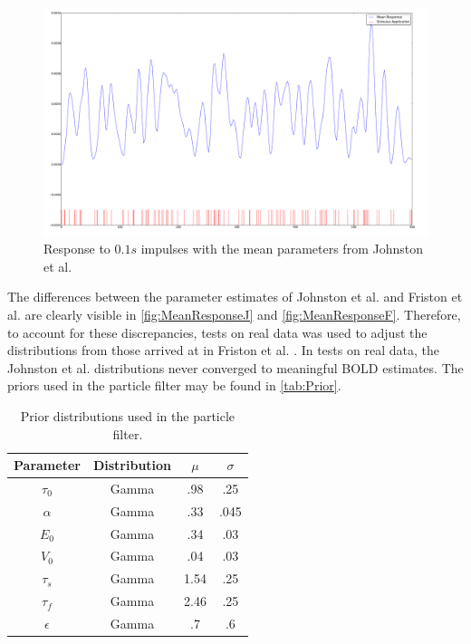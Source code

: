 \begin{figure}
\centering
\includegraphics[trim=6cm 2cm 6cm 2cm,width=15cm]{images/mean_response_johnston}
\caption{Response to $0.1s$ impulses with the mean parameters from 
Johnston et al. \cite{Johnston2007}}
\label{fig:MeanResponseJ}
\end{figure}

The differences between the parameter estimates of Johnston et al.
\cite{Johnston2007} and
Friston et al. \cite{Friston2002b} are clearly visible in 
\autoref{fig:MeanResponseJ} and \autoref{fig:MeanResponseF}.
Therefore, to account for these discrepancies, tests on
real data was used to adjust the distributions from those arrived at in
Friston et al. \cite{Friston2002b}. In tests on real data, the Johnston et al.
\cite{Johnston2007}
distributions never converged to meaningful \ac{BOLD} estimates.
The priors used in the particle filter may be found in \autoref{tab:Prior}.

\begin{table}[t]
\centering
\begin{tabular}{|c || c | c | c |}
\hline
Parameter & Distribution & $\mu$ & $\sigma$ \\
\hline
$\tau_0$ & Gamma & .98 & .25 \\
$\alpha$ & Gamma & .33 & .045\\
$E_0$    & Gamma & .34 & .03  \\
$V_0$    & Gamma & .04 & .03 \\
$\tau_s$ & Gamma & 1.54  & .25\\
$\tau_f$ & Gamma & 2.46  & .25\\
$\epsilon$ & Gamma & .7  & .6 \\
\hline
\end{tabular}
\caption{Prior distributions used in the particle filter.}
\label{tab:Prior}
\end{table}

